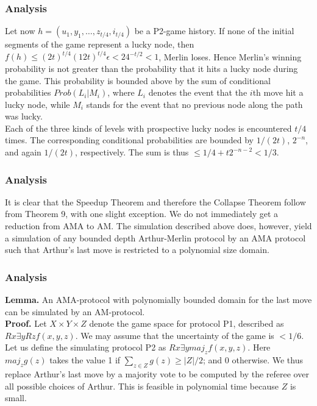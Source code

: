 \documentclass{beamer}
\begin{document}
\begin{frame}
\frametitle{Analysis}
Let now $h = (u_1, y_1,\ldots, z_{t/4}, i_{t/4})$ be a P2-game history. If none of the initial segments of the game represent a lucky node, then $f(h) \leq (2t)^{t/4} (12t)^{t/4} \epsilon < 24^{-t/2} < 1$, Merlin loses. Hence Merlin's winning probability is not greater than the probability that it hits a lucky node during the game. This probability is bounded above by the sum of conditional probabilities $Prob(L_i|M_i)$, where $L_i$ denotes the event that the $i$th move hit a lucky node, while $M_i$ stands for the event that no previous node along the path was lucky.\\
Each of the three kinds of levels with prospective lucky nodes is encountered $t/4$ times. The corresponding conditional probabilities are bounded by $1/(2t)$, $2^{-n}$, and again $1/(2t)$, respectively. The sum is thus $\leq 1/4 + t2^{-n-2} < 1/3$.
\end{frame}

\begin{frame}
\frametitle{Analysis}
It is clear that the Speedup Theorem and therefore the Collapse Theorem follow from Theorem 9, with one slight exception. We do not immediately get a reduction from AMA to AM. The simulation described above does, however, yield a simulation of any bounded depth Arthur-Merlin protocol by an AMA protocol such that Arthur's last move is restricted to a polynomial size domain.\\
\end{frame}

\begin{frame}
\frametitle{Analysis}
\textbf{Lemma.} An AMA-protocol with polynomially bounded domain for the last move can be simulated by an AM-protocol.\\
\textbf{Proof.} Let $X \times Y \times Z$ denote the game space for protocol P1, described as $R x \exists y R z f(x, y, z)$. We may assume that the uncertainty of the game is $< 1/6$. Let us define the simulating protocol P2 as $R x \exists y maj_z f(x, y, z)$. Here $maj_z g(z)$ takes the value 1 if $\sum_{z \in Z} g(z) \geq |Z|/2$; and 0 otherwise. We thus replace Arthur's last move by a majority vote to be computed by the referee over all possible choices of Arthur. This is feasible in polynomial time because $Z$ is small.
\end{frame}
\end{document}
